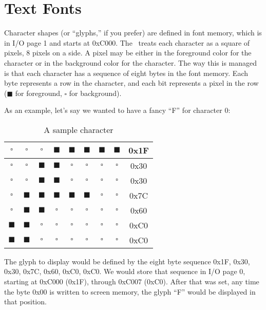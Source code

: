 \section{Text Fonts}

Character shapes (or ``glyphs,'' if you prefer) are defined in font memory, which is in I/O page 1 and starts at 0xC000. The \jr\ treats each character as a square of pixels, 8 pixels on a side. A pixel may be either in the foreground color for the character or in the background color for the character. The way this is managed is that each character has a sequence of eight bytes in the font memory. Each byte represents a row in the character, and each bit represents a pixel in the row ($\blacksquare$ for foreground, $\square$ for background).

As an example, let's say we wanted to have a fancy ``F'' for character 0:

\begin{table}[h]
    \begin{center}
        \begin{tabular}{|c|c|c|c|c|c|c|c|c|} \hline
            $\square$ & $\square$ & $\square$ & $\blacksquare$ & $\blacksquare$ & $\blacksquare$ & $\blacksquare$ & $\blacksquare$ & 0x1F \\ \hline
            $\square$ & $\square$ & $\blacksquare$ & $\blacksquare$ & $\square$ & $\square$ & $\square$ & $\square$ & 0x30 \\ \hline
            $\square$ & $\square$ & $\blacksquare$ & $\blacksquare$ & $\square$ & $\square$ & $\square$ & $\square$ & 0x30 \\ \hline
            $\square$ & $\blacksquare$ & $\blacksquare$ & $\blacksquare$ & $\blacksquare$ & $\blacksquare$ & $\square$ & $\square$ & 0x7C \\ \hline
            $\square$ & $\blacksquare$ & $\blacksquare$ & $\square$ & $\square$ & $\square$ & $\square$ & $\square$ & 0x60 \\ \hline
            $\blacksquare$ & $\blacksquare$ & $\square$ & $\square$ & $\square$ & $\square$ & $\square$ & $\square$ & 0xC0 \\ \hline
            $\blacksquare$ & $\blacksquare$ & $\square$ & $\square$ & $\square$ & $\square$ & $\square$ & $\square$ & 0xC0 \\ \hline
        \end{tabular}
    \end{center}
    \caption{A sample character}
    \label{tab:text_font}
\end{table}

The glyph to display would be defined by the eight byte sequence 0x1F, 0x30, 0x30, 0x7C, 0x60, 0xC0, 0xC0. We would store that sequence in I/O page 0, starting at 0xC000 (0x1F), through 0xC007 (0xC0). After that was set, any time the byte 0x00 is written to screen memory, the glyph ``F'' would be displayed in that position.
